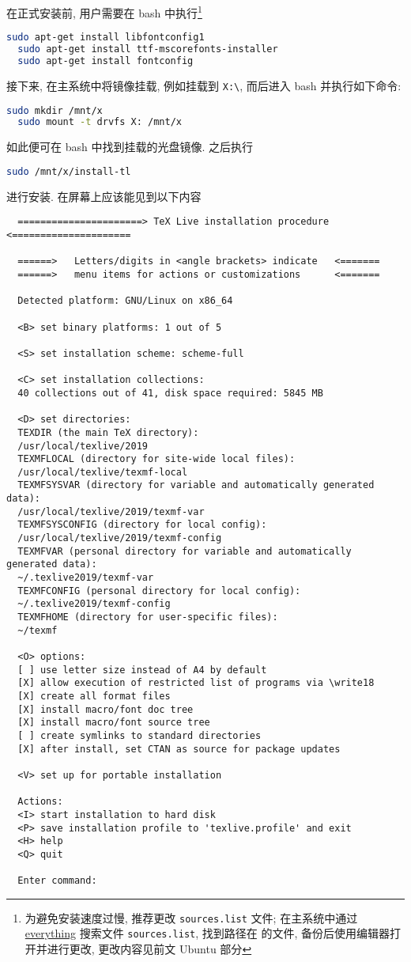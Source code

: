 在正式安装前,
用户需要在 \textsf{bash} 中执行\footnote{为避免安装速度过慢, 推荐更改 \texttt{sources.list} 文件; 在主系统中通过 \href{https://www.voidtools.com/zh-cn/}{everything} 搜索文件 \texttt{sources.list}, 找到路径在  的文件, 备份后使用编辑器打开并进行更改, 更改内容见前文 Ubuntu 部分} 
\begin{lstlisting}[language=bash]
  sudo apt-get install libfontconfig1
  sudo apt-get install ttf-mscorefonts-installer
  sudo apt-get install fontconfig
\end{lstlisting}
接下来, 在主系统中将镜像挂载,
例如挂载到 \texttt{X:\textbackslash},
而后进入 \textsf{bash} 并执行如下命令:
\begin{lstlisting}[language = bash]
  sudo mkdir /mnt/x
  sudo mount -t drvfs X: /mnt/x
\end{lstlisting}
如此便可在 \textsf{bash} 中找到挂载的光盘镜像.
之后执行
\begin{lstlisting}[language = bash]
  sudo /mnt/x/install-tl
\end{lstlisting}
进行安装.
在屏幕上应该能见到以下内容
\begin{lstlisting}
  ======================> TeX Live installation procedure <=====================

  ======>   Letters/digits in <angle brackets> indicate   <=======
  ======>   menu items for actions or customizations      <=======
  
  Detected platform: GNU/Linux on x86_64
  
  <B> set binary platforms: 1 out of 5
  
  <S> set installation scheme: scheme-full
  
  <C> set installation collections:
  40 collections out of 41, disk space required: 5845 MB
  
  <D> set directories:
  TEXDIR (the main TeX directory):
  /usr/local/texlive/2019
  TEXMFLOCAL (directory for site-wide local files):
  /usr/local/texlive/texmf-local
  TEXMFSYSVAR (directory for variable and automatically generated data):
  /usr/local/texlive/2019/texmf-var
  TEXMFSYSCONFIG (directory for local config):
  /usr/local/texlive/2019/texmf-config
  TEXMFVAR (personal directory for variable and automatically generated data):
  ~/.texlive2019/texmf-var
  TEXMFCONFIG (personal directory for local config):
  ~/.texlive2019/texmf-config
  TEXMFHOME (directory for user-specific files):
  ~/texmf

  <O> options:
  [ ] use letter size instead of A4 by default
  [X] allow execution of restricted list of programs via \write18
  [X] create all format files
  [X] install macro/font doc tree
  [X] install macro/font source tree
  [ ] create symlinks to standard directories
  [X] after install, set CTAN as source for package updates
  
  <V> set up for portable installation
  
  Actions:
  <I> start installation to hard disk
  <P> save installation profile to 'texlive.profile' and exit
  <H> help
  <Q> quit
  
  Enter command: 
\end{lstlisting}
